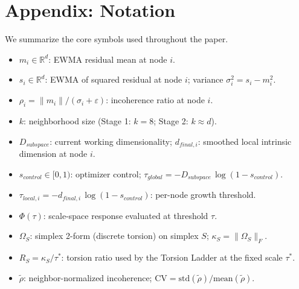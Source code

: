 \documentclass[11pt]{article}
\begin{document}
\section*{Appendix: Notation}
We summarize the core symbols used throughout the paper.
\begin{itemize}[leftmargin=1.5em]
    \item $m_i \in \mathbb R^d$: EWMA residual mean at node $i$.
    \item $s_i \in \mathbb R^d$: EWMA of squared residual at node $i$; variance $\sigma_i^2 = s_i - m_i^2$.
    \item $\rho_i = \lVert m_i \rVert / (\sigma_i + \varepsilon)$: incoherence ratio at node $i$.
    \item $k$: neighborhood size (Stage 1: $k{=}8$; Stage 2: $k{\approx}d$).
    \item $D_{subspace}$: current working dimensionality; $d_{final,i}$: smoothed local intrinsic dimension at node $i$.
    \item $s_{control} \in [0,1)$: optimizer control; $\tau_{global} = -D_{subspace}\,\log(1{-}s_{control})$.
    \item $\tau_{local,i} = -d_{final,i}\,\log(1{-}s_{control})$: per-node growth threshold.
    \item $\Phi(\tau)$: scale-space response evaluated at threshold $\tau$.
    \item $\Omega_S$: simplex 2-form (discrete torsion) on simplex $S$; $\kappa_S = \lVert \Omega_S \rVert_F$.
    \item $R_S = \kappa_S / \tau^*$: torsion ratio used by the Torsion Ladder at the fixed scale $\tau^*$.
    \item $\tilde{\rho}$: neighbor-normalized incoherence; $\mathrm{CV} = \mathrm{std}(\tilde{\rho})/\mathrm{mean}(\tilde{\rho})$.
\end{itemize}
\end{document}
